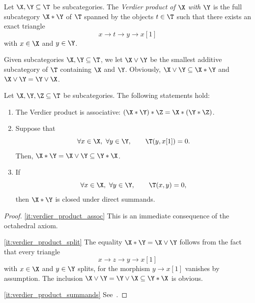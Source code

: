 \documentclass[a4paper]{amsart}
\begin{document}
\begin{definition}
  Let $\X,\Y\subseteq\T$ be subcategories. The \emph{Verdier product of $\X$
    with $\Y$} is the full subcategory $\X*\Y$ of $\T$ spanned by the objects
  $t\in\T$ such that there exists an exact triangle
  \[
    x\longrightarrow t\longrightarrow y\longrightarrow x[1]
  \]
  with $x\in\X$ and $y\in\Y$.
\end{definition}

\begin{notation}
  Given subcategories $\X,\Y\subseteq\T$, we let $\X\vee\Y$ be the smallest
  additive subcategory of $\T$ containing $\X$ and $\Y$. Obviously,
  $\X\vee\Y\subseteq\X*\Y$ and $\X\vee\Y=\Y\vee\X$.
\end{notation}

\begin{lemma}
  \label{lemma:Verdier_product}
  Let $\X,\Y,\Z\subseteq\T$ be subcategories. The following statements hold:
  \begin{enumerate}
  \item\label{it:verdier_product_assoc} The Verdier product is associative:
    $(\X*\Y)*\Z=\X*(\Y*\Z)$.
  \item\label{it:verdier_product_split} Suppose that
    \[
      \forall x\in\X,\ \forall y\in\Y,\qquad \T(y,x[1])=0.
    \]
    Then,
    $\X*\Y=\X\vee\Y\subseteq\Y*\X$. \item\label{it:verdier_product_summands} If
    \[
      \forall x\in\X,\ \forall y\in\Y,\qquad \T(x,y)=0,
    \]
    then $\X*\Y$ is closed under direct summands.
  \end{enumerate}
\end{lemma}
\begin{proof}
  \eqref{it:verdier_product_assoc} This is an immediate consequence of the
  octahedral axiom.

  \eqref{it:verdier_product_split} The equality $\X*\Y=\X\vee\Y$ follows from
  the fact that every triangle
  \[
    x\to z\to y\to x[1]
  \]
  with $x\in\X$ and $y\in\Y$ splits, for the morphism $y\to x[1]$ vanishes by
  assumption. The inclusion $\X\vee\Y=\Y\vee\X\subseteq\Y*\X$ is obvious.

  \eqref{it:verdier_product_summands} See~\cite[Prop.~2.1(1)]{IY08}.
\end{proof}
\end{document}

